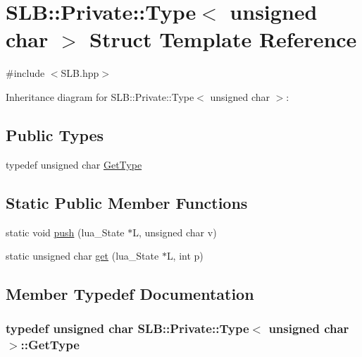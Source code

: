 \hypertarget{structSLB_1_1Private_1_1Type_3_01unsigned_01char_01_4}{}\section{S\+LB\+:\+:Private\+:\+:Type$<$ unsigned char $>$ Struct Template Reference}
\label{structSLB_1_1Private_1_1Type_3_01unsigned_01char_01_4}


{\ttfamily \#include $<$S\+L\+B.\+hpp$>$}



Inheritance diagram for S\+LB\+:\+:Private\+:\+:Type$<$ unsigned char $>$\+:
\subsection*{Public Types}
\begin{DoxyCompactItemize}
\item 
typedef unsigned char \hyperlink{structSLB_1_1Private_1_1Type_3_01unsigned_01char_01_4_a098990e3c6b04a51317e8111dd97b3a0}{Get\+Type}
\end{DoxyCompactItemize}
\subsection*{Static Public Member Functions}
\begin{DoxyCompactItemize}
\item 
static void \hyperlink{structSLB_1_1Private_1_1Type_3_01unsigned_01char_01_4_aa8d2cfff8f7b9c82a0c4ab27aa31adef}{push} (lua\+\_\+\+State $\ast$L, unsigned char v)
\item 
static unsigned char \hyperlink{structSLB_1_1Private_1_1Type_3_01unsigned_01char_01_4_a74626ebc8f1efca731fe834539675d35}{get} (lua\+\_\+\+State $\ast$L, int p)
\end{DoxyCompactItemize}


\subsection{Member Typedef Documentation}
\subsubsection[{\texorpdfstring{Get\+Type}{GetType}}]{\setlength{\rightskip}{0pt plus 5cm}typedef unsigned char {\bf S\+L\+B\+::\+Private\+::\+Type}$<$ unsigned char $>$\+::{\bf Get\+Type}}\hypertarget{structSLB_1_1Private_1_1Type_3_01unsigned_01char_01_4_a098990e3c6b04a51317e8111dd97b3a0}{}\label{structSLB_1_1Private_1_1Type_3_01unsigned_01char_01_4_a098990e3c6b04a51317e8111dd97b3a0}



